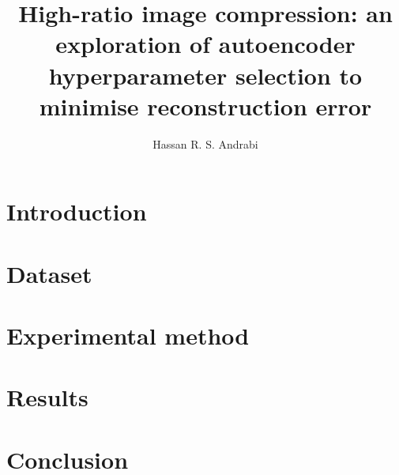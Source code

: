 \documentclass{article}
\title{High-ratio image compression: an exploration of autoencoder hyperparameter selection to minimise reconstruction error}
\author{Hassan R. S. Andrabi}
\date{}
\begin{document}
\maketitle

\begin{abstract}

\end{abstract}

\section{Introduction}\label{sec:introduction}


\section{Dataset}\label{sec:dataset}


\section{Experimental method}\label{sec:experimental-method}


\section{Results}\label{sec:results}


\section{Conclusion}\label{sec:results}


\newpage



\end{document}
